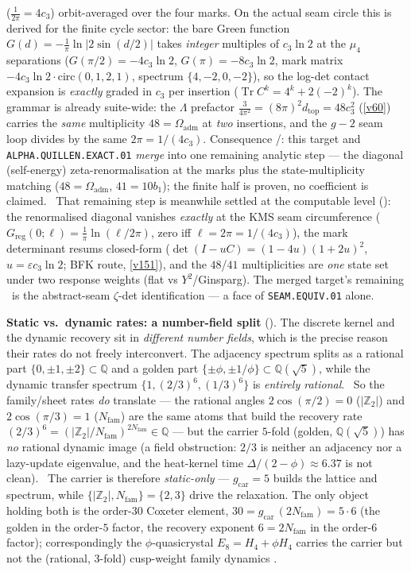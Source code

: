 \documentclass[11pt,a4paper]{article}
\newcommand{\gcar}{g_{\mathrm{car}}}
\newcommand{\Nfam}{N_{\mathrm{fam}}}
\newcommand{\Z}{\mathbb Z}
\begin{document}
($\tfrac1{2\pi}=4c_3$) orbit-averaged over the four marks. On the actual seam circle this is derived for
the finite cycle sector: the bare Green function $G(d)=-\tfrac1\pi\ln|2\sin(d/2)|$ takes \emph{integer}
multiples of $c_3\ln2$ at the $\mu_4$ separations ($G(\pi/2)=-4c_3\ln2$, $G(\pi)=-8c_3\ln2$, mark matrix
$-4c_3\ln2\cdot\mathrm{circ}(0,1,2,1)$, spectrum $\{4,-2,0,-2\}$), so the log-det contact expansion is
\emph{exactly} graded in $c_3$ per insertion ($\operatorname{Tr}C^k=4^k+2(-2)^k$). The grammar is already
suite-wide: the $\Lambda$ prefactor $\tfrac{3}{4\pi^2}=(8\pi)^2 d_{\mathrm{top}}=48c_3^2$ (\vref{v60})
carries the \emph{same} multiplicity $48=\Omega_{\mathrm{adm}}$ at \emph{two} insertions, and the $g{-}2$
seam loop divides by the same $2\pi=1/(4c_3)$. Consequence \mC/\mO: this target and
\texttt{ALPHA.QUILLEN.EXACT.01} \emph{merge} into one remaining analytic step --- the diagonal
(self-energy) zeta-renormalisation at the marks plus the state-multiplicity matching
($48=\Omega_{\mathrm{adm}}$, $41=10b_1$); the finite half is proven, no coefficient is claimed. \mE\ That
remaining step is meanwhile settled at the computable level ():
the renormalised diagonal vanishes \emph{exactly} at the KMS seam circumference
($G_{\mathrm{reg}}(0;\ell)=\tfrac1\pi\ln(\ell/2\pi)$, zero iff $\ell=2\pi=1/(4c_3)$), the mark
determinant resums closed-form ($\det(I-uC)=(1-4u)(1+2u)^2$, $u=\varepsilon c_3\ln2$; BFK route,
\vref{v151}), and the $48$/$41$ multiplicities are \emph{one} state set under two response weights (flat
vs $Y^2$/Ginsparg). The merged target's remaining \mO\ is the abstract-seam $\zeta$-det identification
--- a face of \texttt{SEAM.EQUIV.01} alone.

\par\smallskip\noindent\textbf{Static vs.\ dynamic rates: a number-field split}
(). The discrete kernel and the dynamic recovery sit in \emph{different number
fields}, which is the precise reason their rates do not freely interconvert. The adjacency spectrum splits as a
rational part $\{0,\pm1,\pm2\}\subset\mathbb Q$ and a golden part $\{\pm\phi,\pm1/\phi\}\subset\mathbb Q(\sqrt5)$,
while the dynamic transfer spectrum $\{1,(2/3)^6,(1/3)^6\}$ is \emph{entirely rational}. \mE\ So the family/sheet
rates \emph{do} translate --- the rational angles $2\cos(\pi/2){=}0$ ($|\Z_2|$) and $2\cos(\pi/3){=}1$ ($\Nfam$)
are the same atoms that build the recovery rate $(2/3)^6=(|\Z_2|/\Nfam)^{2\Nfam}\in\mathbb Q$ --- but the carrier
$5$-fold (golden, $\mathbb Q(\sqrt5)$) has \emph{no} rational dynamic image (a field obstruction: $2/3$ is neither
an adjacency nor a lazy-update eigenvalue, and the heat-kernel time $\Delta/(2-\phi)\approx6.37$ is not clean).
\mE\ The carrier is therefore \emph{static-only} --- $\gcar{=}5$ builds the lattice and spectrum, while
$\{|\Z_2|,\Nfam\}{=}\{2,3\}$ drive the relaxation. The only object holding both is the order-$30$ Coxeter element,
$30=\gcar\,(2\Nfam)=5\cdot6$ (the golden in the order-$5$ factor, the recovery exponent $6{=}2\Nfam$ in the
order-$6$ factor); correspondingly the $\phi$-quasicrystal $E_8=H_4{+}\phi H_4$ carries the carrier but not the
(rational, $3$-fold) cusp-weight family dynamics \mC.
\end{document}
